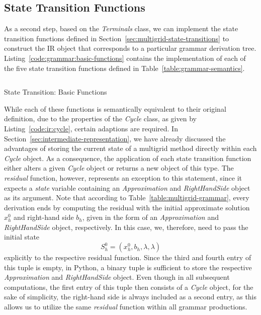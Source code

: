 \subsection{State Transition Functions}
\label{sec:evostencils:state-transition-functions}
As a second step, based on the \emph{Terminals} class, we can implement the state transition functions defined in Section~\ref{sec:multigrid-state-transitions} to construct the IR object that corresponds to a particular grammar derivation tree.
Listing~\ref{code:grammar:basic-functions} contains the implementation of each of the five state transition functions defined in Table~\ref{table:grammar-semantics}.
\begin{listing}
	\inputminted{python}{evostencils/grammar/base.py}
	\caption{State Transition: Basic Functions}
	\label{code:grammar:basic-functions}
\end{listing}
While each of these functions is semantically equivalent to their original definition, due to the properties of the \emph{Cycle} class, as given by Listing~\ref{code:ir:cycle}, certain adaptions are required.
In Section~\ref{sec:intermediate-representation}, we have already discussed the advantages of storing the current state of a multigrid method directly within each \emph{Cycle} object.
As a consequence, the application of each state transition function either alters a given \emph{Cycle} object or returns a new object of this type.
The \emph{residual} function, however, represents an exception to this statement, since it expects a \emph{state} variable containing an \emph{Approximation} and \emph{RightHandSide} object as its argument.
Note that according to Table~\ref{table:multigrid-grammar}, every derivation ends by computing the residual with the initial approximate solution $x_h^0$ and right-hand side $b_h$, given in the form of an \emph{Approximation} and \emph{RightHandSide} object, respectively.
In this case, we, therefore, need to pass the initial state 
\begin{equation*}
	S_h^0 = (x_h^0, b_h, \lambda, \lambda)
\end{equation*} explicitly to the respective residual function.
Since the third and fourth entry of this tuple is empty, in Python, a binary tuple is sufficient to store the respective \emph{Approximation} and \emph{RightHandSide} object.
Even though in all subsequent computations, the first entry of this tuple then consists of a \emph{Cycle} object, for the sake of simplicity, the right-hand side is always included as a second entry, as this allows us to utilize the same \emph{residual} function within all grammar productions.
